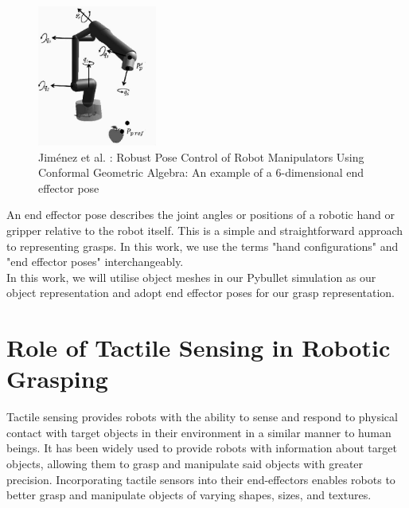 \documentclass[11pt, a4paper]{report}
\begin{document}
\begin{figure}[H]
    \centering
    \includegraphics[width=0.35\textwidth]{docs/Project Report/Media/2_1_2_ee_pose_eg.png}
    \caption{Jiménez et al. \cite{jimenez2014}: Robust Pose Control of Robot Manipulators Using Conformal Geometric Algebra: An example of a 6-dimensional end effector pose}
    \label{fig:2.5}
\end{figure}

An end effector pose describes the joint angles or positions of a robotic hand or gripper relative to the robot itself. This is a simple and straightforward approach to representing grasps. In this work, we use the terms "hand configurations" and "end effector poses" interchangeably.\\

In this work, we will utilise object meshes in our Pybullet simulation as our object representation and adopt end effector poses for our grasp representation.


\section{Role of Tactile Sensing in Robotic Grasping}
\label{sec:2.2}
Tactile sensing provides robots with the ability to sense and respond to physical contact with target objects in their environment in a similar manner to human beings. It has been widely used to provide robots with information about target objects, allowing them to grasp and manipulate said objects with greater precision. Incorporating tactile sensors into their end-effectors enables robots to better grasp and manipulate objects of varying shapes, sizes, and textures.\\
\end{document}
